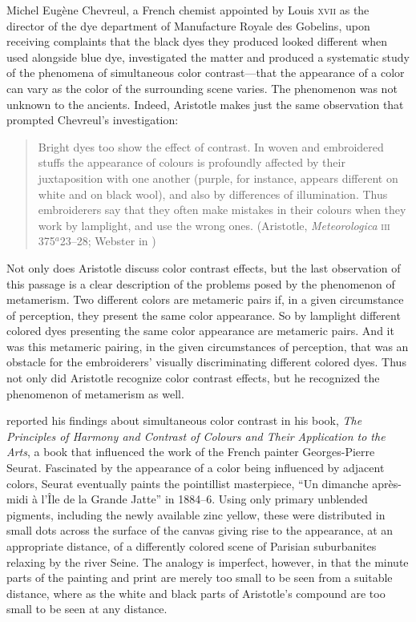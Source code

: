 Michel Eugène Chevreul, a French chemist appointed by Louis \textsc{xvii} as the director of the dye department of Manufacture Royale des Gobelins, upon receiving complaints that the black dyes they produced looked different when used alongside blue dye, investigated the matter and produced a systematic study of the phenomena of simultaneous color contrast---that the appearance of a color can vary as the color of the surrounding scene varies. The phenomenon was not unknown to the ancients. Indeed, Aristotle makes just the same observation that prompted Chevreul's investigation: 
\begin{quote}
	Bright dyes too show the effect of contrast. In woven and embroidered stuffs the appearance of colours is profoundly affected by their juxtaposition with one another (purple, for instance, appears different on white and on black wool), and also by differences of illumination. Thus embroiderers say that they often make mistakes in their colours when they work by lamplight, and use the wrong ones. (Aristotle, \emph{Meteorologica} \textsc{iii} 375\( ^{a} \)23--28; Webster in \citealt[61]{Barnes:1984uq})
\end{quote}
Not only does Aristotle discuss color contrast effects, but the last observation of this passage is a clear description of the problems posed by the phenomenon of metamerism. Two different colors are metameric pairs if, in a given circumstance of perception, they present the same color appearance. So by lamplight different colored dyes presenting the same color appearance are metameric pairs. And it was this metameric pairing, in the given circumstances of perception, that was an obstacle for the embroiderers' visually discriminating different colored dyes. Thus not only did Aristotle recognize color contrast effects, but he recognized the phenomenon of metamerism as well.

\citet{Chevreul:1855kx} reported his findings about simultaneous color contrast in his book, \emph{The Principles of Harmony and Contrast of Colours and Their Application to the Arts}, a book that influenced the work of the French painter Georges-Pierre Seurat. Fascinated by the appearance of a color being influenced by adjacent colors, Seurat eventually paints the pointillist masterpiece, “Un dimanche apr\`{e}s-midi \`{a} l'\^{I}le de la Grande Jatte” in 1884--6. Using only primary unblended pigments, including the newly available zinc yellow, these were distributed in small dots across the surface of the canvas giving rise to the appearance, at an appropriate distance, of a differently colored scene of Parisian suburbanites relaxing by the river Seine. The analogy is imperfect, however, in that the minute parts of the painting and print are merely too small to be seen from a suitable distance, where as the white and black parts of Aristotle's compound are too small to be seen at any distance.

